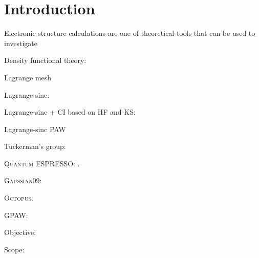 \section{Introduction}

Electronic structure calculations are one of theoretical tools that can be used to
investigate

Density functional theory: \cite{Hohenberg1964,Kohn1965}

Lagrange mesh \cite{Baye2015}

Lagrange-sinc: \cite{Choi2015,Choi2016}

Lagrange-sinc + CI based on HF and KS: \cite{Kim2015}

Lagrange-sinc PAW \cite{Kang2016}

Tuckerman's group: \cite{HeeSeungLee2006,HeeSeungLee2006,HeeSeungLee2008}

\textsc{Quantum ESPRESSO}: \cite{Giannozzi2009,Giannozzi2017}.

\textsc{Gaussian09}: \cite{Gaussian2009}

\textsc{Octopus}: \cite{Marques2003,Castro2006,Xavier2015}

GPAW: \cite{Enkovaara2010}

Objective:

Scope: